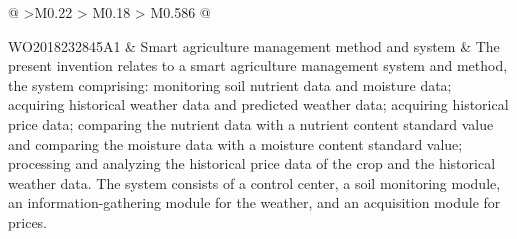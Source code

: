 \begin{longtable}[H]{@{}
        >{\centering\arraybackslash}M{0.22\textwidth}
        >{\justifying\sloppy\arraybackslash} M{0.18\textwidth}
        >{\justifying\sloppy\arraybackslash} M{0.586\textwidth}
        @{}}
                \midrule
                
                WO2018232845A1 & Smart agriculture management method and system & The present invention relates to a smart agriculture management system and method, the system comprising: monitoring soil nutrient data and moisture data; acquiring historical weather data and predicted weather data; acquiring historical price data; comparing the nutrient data with a nutrient content standard value and comparing the moisture data with a moisture content standard value; processing and analyzing the historical price data of the crop and the historical weather data. The system consists of a control center, a soil monitoring module, an information-gathering module for the weather, and an acquisition module for prices.\\
                
                \bottomrule
            \caption{Literature Review - summary of patents studied}
        \end{longtable}